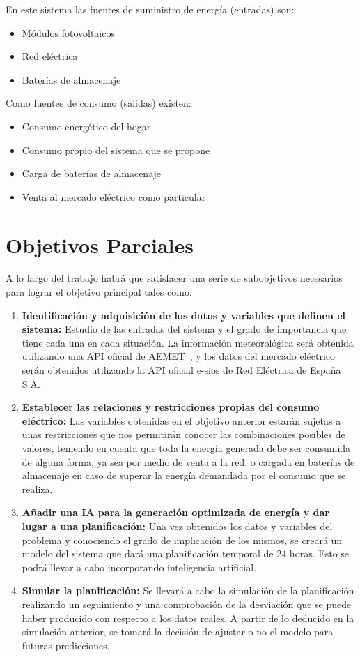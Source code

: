 En este sistema las fuentes de suministro de energía (entradas) son:
\begin{itemize}
	\item Módulos fotovoltaicos
	\item Red eléctrica
	\item Baterías de almacenaje
\end{itemize}
Como fuentes de consumo (salidas) existen:
\begin{itemize}
	\item Consumo energético del hogar
	\item Consumo propio del sistema que se propone
	\item Carga de baterías de almacenaje
	\item Venta al mercado eléctrico como particular
\end{itemize}

\section{Objetivos Parciales}
A lo largo del trabajo habrá que satisfacer una serie de subobjetivos necesarios para lograr el objetivo principal tales como:
\begin{enumerate}
	\item \textbf{Identificación y adquisición de los datos y variables que definen el sistema:}
	Estudio de las entradas del sistema y el grado de importancia que tiene cada una en cada situación. La información meteorológica será obtenida utilizando una API oficial de AEMET~\cite{Aemet}, y los datos del mercado eléctrico serán obtenidos utilizando la API oficial e-sios de Red Eléctrica de España S.A.~\cite{Esios} 
	
	\item \textbf{Establecer las relaciones y restricciones propias del consumo eléctrico:}
	Las variables obtenidas en el objetivo anterior estarán sujetas a unas restricciones que nos permitirán conocer las combinaciones posibles de valores, teniendo en cuenta que toda la energía generada debe ser consumida de alguna forma, ya sea por medio de venta a la red, o cargada en baterías de almacenaje en caso de superar la energía demandada por el consumo que se realiza.
	
	\item \textbf{Añadir una IA para la generación optimizada de energía y dar lugar a una planificación:}
	Una vez obtenidos los datos y variables del problema y conociendo el grado de implicación de los mismos, se creará un modelo del sistema que dará una planificación temporal de 24 horas. Esto se podrá llevar a cabo incorporando inteligencia artificial.
	
	\item \textbf{Simular la planificación:}
	Se llevará a cabo la simulación de la planificación realizando un seguimiento y una comprobación de la desviación que se puede haber producido con respecto a los datos reales. A partir de lo deducido en la simulación anterior, se tomará la decisión de ajustar o no el modelo para futuras predicciones.
\end{enumerate}

